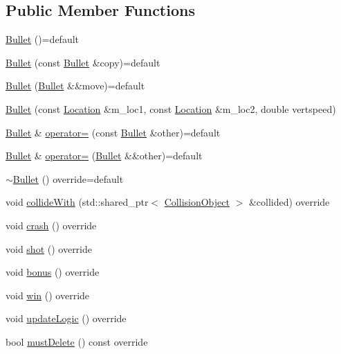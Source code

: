 \subsection*{Public Member Functions}
\begin{DoxyCompactItemize}
\item 
\hyperlink{classroadfighter_1_1Bullet_abae3f231af0b423fc6ca0d0d5639fed5}{Bullet} ()=default
\item 
\hyperlink{classroadfighter_1_1Bullet_a5ee7b1e8b458efef1c60ed1acebb8e9e}{Bullet} (const \hyperlink{classroadfighter_1_1Bullet}{Bullet} \&copy)=default
\item 
\hyperlink{classroadfighter_1_1Bullet_a20d663e607a956782dcaee5fc514da5c}{Bullet} (\hyperlink{classroadfighter_1_1Bullet}{Bullet} \&\&move)=default
\item 
\hyperlink{classroadfighter_1_1Bullet_a15ab9848b269b1ef463defbb6967deb0}{Bullet} (const \hyperlink{classroadfighter_1_1Location}{Location} \&m\+\_\+loc1, const \hyperlink{classroadfighter_1_1Location}{Location} \&m\+\_\+loc2, double vertspeed)
\item 
\hyperlink{classroadfighter_1_1Bullet}{Bullet} \& \hyperlink{classroadfighter_1_1Bullet_ab507000db2f726b8906ced3ea4c7782f}{operator=} (const \hyperlink{classroadfighter_1_1Bullet}{Bullet} \&other)=default
\item 
\hyperlink{classroadfighter_1_1Bullet}{Bullet} \& \hyperlink{classroadfighter_1_1Bullet_a7c63a2a326738605af30ad850272d3b7}{operator=} (\hyperlink{classroadfighter_1_1Bullet}{Bullet} \&\&other)=default
\item 
\hyperlink{classroadfighter_1_1Bullet_a297de09c51315af09bd676801cc4e2bd}{$\sim$\+Bullet} () override=default
\item 
void \hyperlink{classroadfighter_1_1Bullet_a36156632331e59c11abf5ae76024bc1f}{collide\+With} (std\+::shared\+\_\+ptr$<$ \hyperlink{classroadfighter_1_1CollisionObject}{Collision\+Object} $>$ \&collided) override
\item 
void \hyperlink{classroadfighter_1_1Bullet_ac96121377fffa9ed8ea94c333a841a7a}{crash} () override
\item 
void \hyperlink{classroadfighter_1_1Bullet_acaacd303f1f4e55c5029d4a4cbe1d9b1}{shot} () override
\item 
void \hyperlink{classroadfighter_1_1Bullet_a642ca8467a0ffea844d18d4917b2f49e}{bonus} () override
\item 
void \hyperlink{classroadfighter_1_1Bullet_a566adb0235665312365cd65536c2aafc}{win} () override
\item 
void \hyperlink{classroadfighter_1_1Bullet_a13aa730279ee8590d0eb2f9e6c01f265}{update\+Logic} () override
\item 
bool \hyperlink{classroadfighter_1_1Bullet_a0f87b693a1583522e551ba1324fcd067}{must\+Delete} () const override
\end{DoxyCompactItemize}


